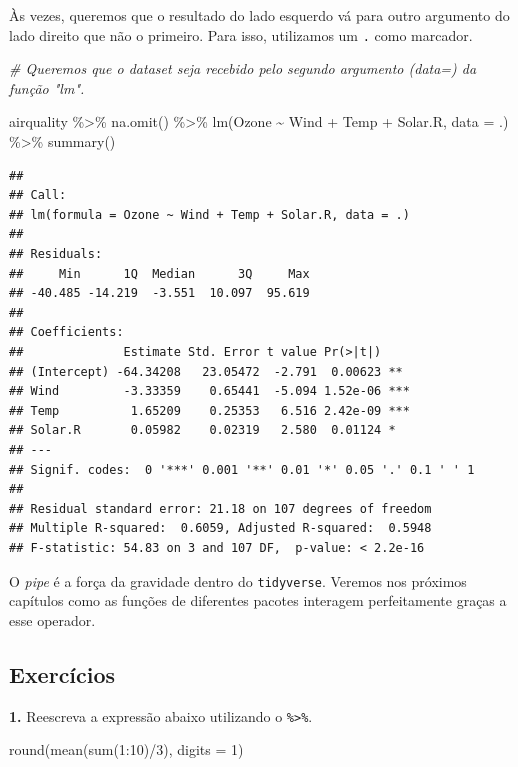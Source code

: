 \documentclass[
]{book}
\newenvironment{Shaded}{\begin{snugshade}}{\end{snugshade}}
\newcommand{\AttributeTok}[1]{\textcolor[rgb]{0.77,0.63,0.00}{#1}}
\newcommand{\CommentTok}[1]{\textcolor[rgb]{0.56,0.35,0.01}{\textit{#1}}}
\newcommand{\DecValTok}[1]{\textcolor[rgb]{0.00,0.00,0.81}{#1}}
\newcommand{\FunctionTok}[1]{\textcolor[rgb]{0.00,0.00,0.00}{#1}}
\newcommand{\NormalTok}[1]{#1}
\newcommand{\SpecialCharTok}[1]{\textcolor[rgb]{0.00,0.00,0.00}{#1}}
\begin{document}
Às vezes, queremos que o resultado do lado esquerdo vá para outro argumento do lado direito que não o primeiro. Para isso, utilizamos um \texttt{.} como marcador.

\begin{Shaded}
\begin{Highlighting}[]
\CommentTok{\# Queremos que o dataset seja recebido pelo segundo argumento (data=) da função "lm".}

\NormalTok{airquality }\SpecialCharTok{\%\textgreater{}\%}
  \FunctionTok{na.omit}\NormalTok{() }\SpecialCharTok{\%\textgreater{}\%}
  \FunctionTok{lm}\NormalTok{(Ozone }\SpecialCharTok{\textasciitilde{}}\NormalTok{ Wind }\SpecialCharTok{+}\NormalTok{ Temp }\SpecialCharTok{+}\NormalTok{ Solar.R, }\AttributeTok{data =}\NormalTok{ .) }\SpecialCharTok{\%\textgreater{}\%}
  \FunctionTok{summary}\NormalTok{()}
\end{Highlighting}
\end{Shaded}

\begin{verbatim}
## 
## Call:
## lm(formula = Ozone ~ Wind + Temp + Solar.R, data = .)
## 
## Residuals:
##     Min      1Q  Median      3Q     Max 
## -40.485 -14.219  -3.551  10.097  95.619 
## 
## Coefficients:
##              Estimate Std. Error t value Pr(>|t|)    
## (Intercept) -64.34208   23.05472  -2.791  0.00623 ** 
## Wind         -3.33359    0.65441  -5.094 1.52e-06 ***
## Temp          1.65209    0.25353   6.516 2.42e-09 ***
## Solar.R       0.05982    0.02319   2.580  0.01124 *  
## ---
## Signif. codes:  0 '***' 0.001 '**' 0.01 '*' 0.05 '.' 0.1 ' ' 1
## 
## Residual standard error: 21.18 on 107 degrees of freedom
## Multiple R-squared:  0.6059, Adjusted R-squared:  0.5948 
## F-statistic: 54.83 on 3 and 107 DF,  p-value: < 2.2e-16
\end{verbatim}

O \emph{pipe} é a força da gravidade dentro do \texttt{tidyverse}. Veremos nos próximos capítulos como as funções de diferentes pacotes interagem perfeitamente graças a esse operador.

\hypertarget{exercuxedcios-10}{%
\subsection*{Exercícios}\label{exercuxedcios-10}}

\textbf{1.} Reescreva a expressão abaixo utilizando o \texttt{\%\textgreater{}\%}.

\begin{Shaded}
\begin{Highlighting}[]
\FunctionTok{round}\NormalTok{(}\FunctionTok{mean}\NormalTok{(}\FunctionTok{sum}\NormalTok{(}\DecValTok{1}\SpecialCharTok{:}\DecValTok{10}\NormalTok{)}\SpecialCharTok{/}\DecValTok{3}\NormalTok{), }\AttributeTok{digits =} \DecValTok{1}\NormalTok{)}
\end{Highlighting}
\end{Shaded}
\end{document}
